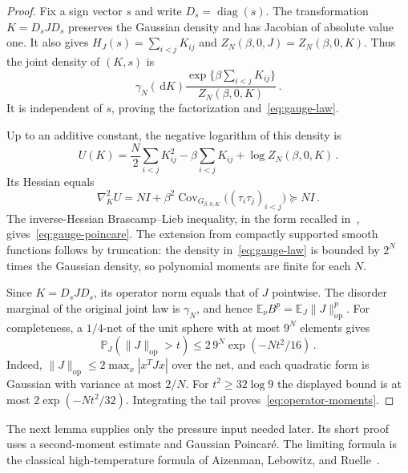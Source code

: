 \documentclass[11pt]{amsart}
\numberwithin{equation}{section}
\theoremstyle{remark}
\newcommand{\E}{\mathbb E}
\newcommand{\Pp}{\mathbb P}
\newcommand{\Cov}{\operatorname{Cov}}
\newcommand{\diag}{\operatorname{diag}}
\newcommand{\op}{\mathrm{op}}
\newcommand{\dd}{\,\mathrm d}
\begin{document}
\begin{proof}
Fix a sign vector $s$ and write $D_s=\diag(s)$. The transformation $K=D_sJD_s$ preserves the Gaussian density and has Jacobian of absolute value one. It also gives $H_J(s)=\sum_{i<j}K_{ij}$ and $Z_N(\beta,0,J)=Z_N(\beta,0,K)$. Thus the joint density of $(K,s)$ is
\begin{equation*}
 \gamma_N(\dd K)
 \frac{\exp\{\beta\sum_{i<j}K_{ij}\}}{Z_N(\beta,0,K)}\,.
\end{equation*}
It is independent of $s$, proving the factorization and~\eqref{eq:gauge-law}.

Up to an additive constant, the negative logarithm of this density is
\begin{equation}
 U(K)=\frac N2\sum_{i<j}K_{ij}^2
 -\beta\sum_{i<j}K_{ij}+\log Z_N(\beta,0,K)\,.
 \label{eq:gauge-potential}
\end{equation}
Its Hessian equals
\begin{equation*}
 \nabla_K^2U=NI+
 \beta^2\Cov_{G_{\beta,0,K}}\bigl((\tau_i\tau_j)_{i<j}\bigr)
 \succeq NI\,.
\end{equation*}
The inverse-Hessian Brascamp--Lieb inequality, in the form recalled in~\cite[(1.3)]{Carlen2011}, gives~\eqref{eq:gauge-poincare}. The extension from compactly supported smooth functions follows by truncation: the density in~\eqref{eq:gauge-law} is bounded by $2^N$ times the Gaussian density, so polynomial moments are finite for each $N$.

Since $K=D_sJD_s$, its operator norm equals that of $J$ pointwise. The disorder marginal of the original joint law is $\gamma_N$, and hence $\E_\nu B^p=\E_J\|J\|_\op^p$. For completeness, a $1/4$-net of the unit sphere with at most $9^N$ elements gives
\begin{equation*}
 \Pp_J(\|J\|_\op>t)
 \le 2\,9^N\exp(-Nt^2/16)\,.
\end{equation*}
Indeed, $\|J\|_\op\le2\max_x|x^TJx|$ over the net, and each quadratic form is Gaussian with variance at most $2/N$. For $t^2\ge32\log9$ the displayed bound is at most $2\exp(-Nt^2/32)$. Integrating the tail proves~\eqref{eq:operator-moments}.
\end{proof}

The next lemma supplies only the pressure input needed later. Its short proof uses a second-moment estimate and Gaussian Poincar\'e. The limiting formula is the classical high-temperature formula of Aizenman, Lebowitz, and Ruelle~\cite[Proposition~2.1(ii)]{ALR1987}.
\end{document}
